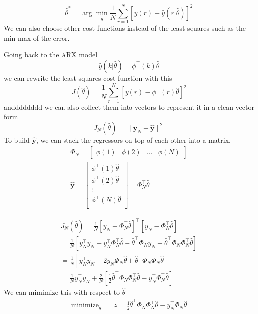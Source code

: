 \documentclass[11pt]{article}
\begin{document}
\begin{equation}
    \hat{\theta}^* = \arg \min_{\hat{\theta}} \frac{1}{N} \sum_{r=1}^{N} [y(r) - \hat{y} (r | \hat{\theta})]^2
\end{equation}
We can also choose other cost functions instead of the least-squares such as the min max of the error.

Going back to the ARX model
\begin{equation}
    \hat{y} (k | \hat{\theta}) = \phi^\top (k) \hat{\theta}
\end{equation}
we can rewrite the least-squares cost function with this 
\begin{equation}
    J(\hat{\theta}) = \frac{1}{N} \sum_{r=1}^{N} [y(r) - \phi^\top(r) \hat{\theta}]^2
\end{equation}
andddddddd we can also collect them into vectors to represent it in a clean vector form
\begin{equation}
    J_N(\hat{\theta}) = \| \textbf{y}_N - \hat{\textbf{y}} \|^2
\end{equation}
To build $\hat{\textbf{y}}$, we can stack the regressors on top of each other into a matrix.
\begin{align}
    \Phi_N = 
  \begin{bmatrix}
    \phi(1) & \phi(2) & \dots & \phi(N)
  \end{bmatrix}
  \\
  \hat{\textbf{y}} = 
  \begin{bmatrix}
    \phi^\top (1) \hat{\theta} \\
    \phi^\top (2) \hat{\theta} \\ 
    \vdots \\
    \phi^\top (N) \hat{\theta} \\ 
  \end{bmatrix}
  =
  \Phi_N^\top \hat{\theta}
\end{align}

\begin{gather}
    J_N(\hat{\theta}) = \frac{1}{N} [y_N - \Phi_N^\top \hat{\theta}]^\top [ y_N - \Phi_N^\top \hat{\theta}] \\
    = \frac{1}{N} [y_N^\top y_N - y_N^\top \Phi_N^\top \hat{\theta} - \hat{\theta}^\top \Phi_N y_N + \hat{\theta}^\top \Phi_N \Phi_N^\top \hat{\theta}] \\
    = \frac{1}{N} [y_N^\top y_N - 2y_N^\top \Phi_N^\top \hat{\theta}+ \hat{\theta}^\top \Phi_N \Phi_N^\top \hat{\theta}] \\
    = \frac{1}{N} y_N^\top y_N + \frac{2}{N}[\frac{1}{2} \hat{\theta}^\top \Phi_N \Phi_N^\top \hat{\theta} -  y_N^\top \Phi_N^\top \hat{\theta} ]
\end{gather}
We can mimimize this with respect to $\hat{\theta}$
\begin{align}
  \text{minimize}_{\hat{\theta}} & \quad z = \frac{1}{2} \hat{\theta}^\top \Phi_N \Phi_N^\top \hat{\theta} -  y_N^\top \Phi_N^\top \hat{\theta}
\end{align}
\end{document}
